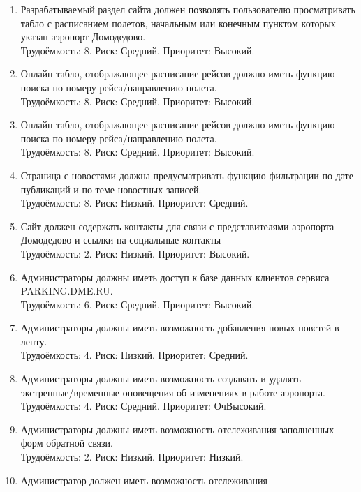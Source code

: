 
\begin{enumerate}
    \item Разрабатываемый раздел сайта должен позволять пользователю
          просматривать табло с расписанием полетов, начальным или
          конечным пунктом которых указан аэропорт Домодедово. \\
          Трудоёмкость: 8. Риск: Средний. Приоритет: Высокий.
    \item Онлайн табло, отображающее расписание рейсов должно иметь
          функцию поиска по номеру рейса/направлению полета. \\
          Трудоёмкость: 8. Риск: Средний. Приоритет: Высокий.
    \item Онлайн табло, отображающее расписание рейсов должно иметь
          функцию поиска по номеру рейса/направлению полета. \\
          Трудоёмкость: 8. Риск: Средний. Приоритет: Высокий.
    \item Страница с новостями должна предусматривать функцию
          фильтрации по дате публикаций и по теме новостных записей. \\
          Трудоёмкость: 8. Риск: Низкий. Приоритет: Средний.
    \item Сайт должен содержать контакты для связи с представителями
          аэропорта Домодедово и ссылки на социальные контакты \\
          Трудоёмкость: 2. Риск: Низкий. Приоритет: Высокий.
    \item Администраторы должны иметь доступ к базе данных клиентов
          сервиса PARKING.DME.RU. \\
          Трудоёмкость: 6. Риск: Средний. Приоритет: Высокий.
    \item Администраторы должны иметь возможность добавления новых
          новстей в ленту. \\
          Трудоёмкость: 4. Риск: Низкий. Приоритет: Средний.
    \item Администраторы должны иметь возможность создавать и удалять
          экстренные/временные оповещения об изменениях в работе аэропорта. \\
          Трудоёмкость: 4. Риск: Средний. Приоритет: ОчВысокий.
    \item Администраторы должны иметь возможность отслеживания
          заполненных форм обратной связи. \\
          Трудоёмкость: 2. Риск: Низкий. Приоритет: Низкий.
    \item Администратор должен иметь возможность отслеживания

\end{enumerate}
